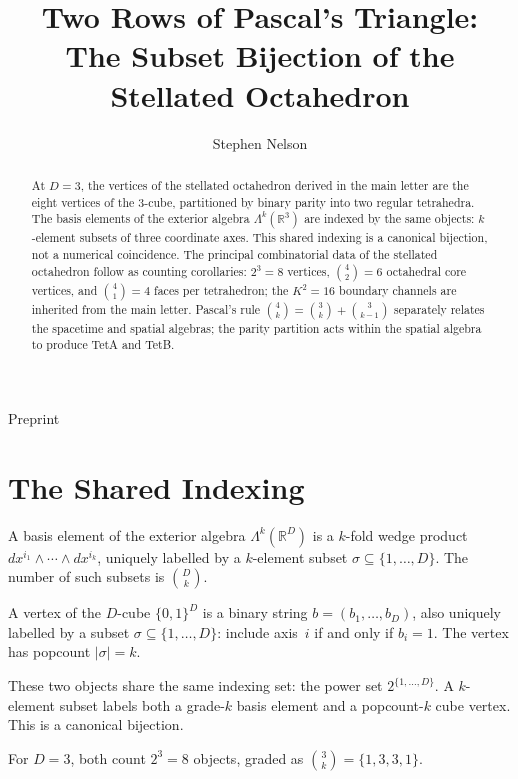 \documentclass[twocolumn]{iopjournal}
\renewcommand{\articletype}[1]{%
  {\vspace*{-8mm}\noindent \Large \sf Preprint}\par
  \vspace*{6mm}\noindent{\scriptsize \sf{\bfseries \MakeUppercase{#1}}}}
\begin{document}
\articletype{Companion Note}

\title{Two Rows of Pascal's Triangle:\\The Subset Bijection of the Stellated Octahedron}

\author{Stephen Nelson}


\begin{abstract}
At $D = 3$, the vertices of the stellated octahedron derived in the main letter are the eight vertices of the 3-cube, partitioned by binary parity into two regular tetrahedra. The basis elements of the exterior algebra $\Lambda^k(\mathbb{R}^3)$ are indexed by the same objects: $k$-element subsets of three coordinate axes. This shared indexing is a canonical bijection, not a numerical coincidence. The principal combinatorial data of the stellated octahedron follow as counting corollaries: $2^3 = 8$ vertices, $\binom{4}{2} = 6$ octahedral core vertices, and $\binom{4}{1} = 4$ faces per tetrahedron; the $K^2 = 16$ boundary channels are inherited from the main letter. Pascal's rule $\binom{4}{k} = \binom{3}{k} + \binom{3}{k-1}$ separately relates the spacetime and spatial algebras; the parity partition acts within the spatial algebra to produce TetA and TetB.
\end{abstract}


\section*{The Shared Indexing}

A basis element of the exterior algebra $\Lambda^k(\mathbb{R}^D)$ is a $k$-fold wedge product $dx^{i_1} \wedge \cdots \wedge dx^{i_k}$, uniquely labelled by a $k$-element subset $\sigma \subseteq \{1, \ldots, D\}$. The number of such subsets is $\binom{D}{k}$.

A vertex of the $D$-cube $\{0,1\}^D$ is a binary string $b = (b_1, \ldots, b_D)$, also uniquely labelled by a subset $\sigma \subseteq \{1, \ldots, D\}$: include axis~$i$ if and only if $b_i = 1$. The vertex has popcount $|\sigma| = k$.

These two objects share the same indexing set: the power set $2^{\{1,\ldots,D\}}$. A $k$-element subset labels both a grade-$k$ basis element and a popcount-$k$ cube vertex. This is a canonical bijection.

For $D = 3$, both count $2^3 = 8$ objects, graded as $\binom{3}{k} = \{1, 3, 3, 1\}$.
\end{document}
